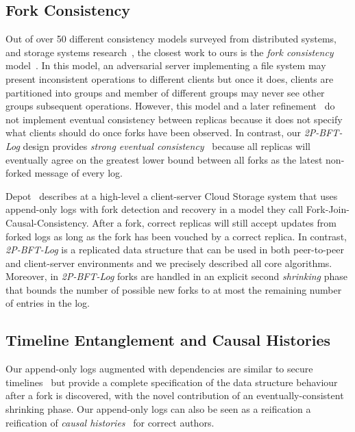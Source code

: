 \documentclass[9pt, oneside]{article}   	%
\begin{document}
\subsection{Fork Consistency}

Out of over 50 different consistency models surveyed from distributed systems, and storage systems research~\cite{viotti2016consistency-db-survey}, the closest work to ours is the \textit{fork consistency} model~\cite{mazieres2002sfs-byzantine-storage}. In this model, an adversarial server implementing a file system may present inconsistent operations to different clients but once it does, clients are partitioned into groups and member of different groups may never see other groups subsequent operations. However, this model and a later refinement~\cite{li2007beyondonethirdbft} do not implement eventual consistency between replicas because it does not specify what clients should do once forks have been observed. In contrast, our \textit{2P-BFT-Log} design provides \textit{strong eventual consistency}~\cite{Shapiro2011CRDTs} because all replicas will eventually agree on the greatest lower bound between all forks as the latest non-forked message of every log. 

Depot~\cite{mahajan2011depot} describes at a high-level a client-server Cloud Storage system that uses append-only logs with fork detection and recovery in a model they call Fork-Join-Causal-Consistency. After a fork, correct replicas will still accept updates from forked logs as long as the fork has been vouched by a correct replica. In contrast, \textit{2P-BFT-Log} is a replicated data structure that can be used in both peer-to-peer and client-server environments and we precisely described all core algorithms.  Moreover, in \textit{2P-BFT-Log} forks are handled in an explicit second \textit{shrinking} phase that bounds the number of possible new forks to at most the remaining number of entries in the log.


\subsection{Timeline Entanglement and Causal Histories}

 Our append-only logs augmented with dependencies are similar to secure timelines~\cite{maniatis2002secure-timeline-entanglement} but provide a complete specification of the data structure behaviour after a fork is discovered, with the novel contribution of an eventually-consistent shrinking phase. Our append-only logs can also be seen as a reification a reification of \textit{causal histories}~\cite{schwarz1994detecting} for correct authors.
\end{document}
